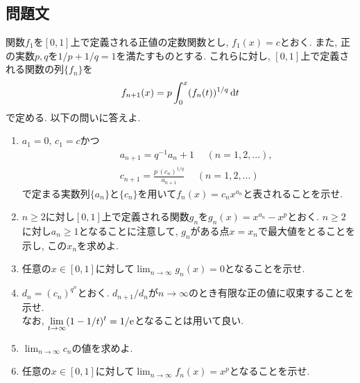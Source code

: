 \documentclass[dvipdfmx,titlepage, 11pt, a4paper]{jsarticle}%
\begin{document}
\section{}%
\subsection{問題文}
関数$f_{1}$を$[0,1]$上で定義される正値の定数関数とし, $f_{1}(x)=c$とおく. また, 正の実数$p,q$を$1/p+1/q=1$を満たすものとする. これらに対し, $[0,1]$上で定義される関数の列$\{f_{n}\}$を
\begin{eqnarray*}
	f_{n+1}(x)=p\int_{0}^{x}(f_{n}(t))^{1/q}\,{\rm d} t
\end{eqnarray*}
で定める. 以下の問いに答えよ.
\begin{enumerate}[(1)]
	\setlength{\itemsep}{10pt}
	\item $a_{1}=0,\,c_{1}=c$かつ
	      \begin{eqnarray*}
		      && a_{n+1}=q^{-1}a_{n}+1\hspace{15pt} (n=1,2,...),\\
		      && c_{n+1}=\frac{p\,(c_{n})^{1/q}}{a_{n+1}}\hspace{15pt} (n=1,2,...)
	      \end{eqnarray*}
	      で定まる実数列$\{a_{n}\}$と$\{c_{n}\}$を用いて$f_{n}(x)=c_{n}x^{a_{n}}$と表されることを示せ.
	\item $n\geq 2$に対し$[0,1]$上で定義される関数$g_{n}$を$g_{n}(x)=x^{a_{n}}-x^{p}$とおく. $n\geq 2$に対し$a_{n}\geq 1$となることに注意して, $g_{n}$がある点$x=x_{n}$で最大値をとることを示し, この$x_{n}$を求めよ.
	\item 任意の$x\in [0,1]$に対して$\displaystyle \lim_{n\to \infty}g_{n}(x)=0$となることを示せ.
	\item $d_{n}=(c_{n})^{q^{n}}$とおく. $d_{n+1}/d_{n}$が$n\to \infty$のとき有限な正の値に収束することを示せ.\\
	      なお, $\displaystyle \lim_{t\to \infty}(1-1/t)^{t}=1/{\rm e}$となることは用いて良い.
	\item $\displaystyle \lim_{n\to \infty}c_{n}$の値を求めよ.
	\item 任意の$x\in[0,1]$に対して$\displaystyle \lim_{n\to \infty}f_{n}(x)=x^{p}$となることを示せ.
\end{enumerate}
\newpage
\end{document}
